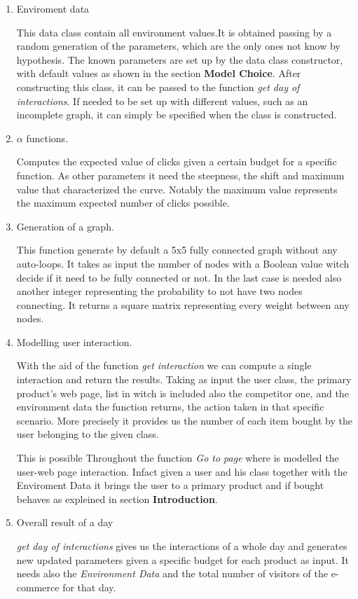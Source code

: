  \begin{enumerate}
     \item  Enviroment data
     
     This data class contain all environment values.It is obtained passing by a random generation of the parameters, which are the only ones not know by hypothesis. The known parameters are set up by the data class constructor, with default values as shown in the section \textbf{Model Choice}. After constructing this class, it can be passed to the function  \textit{get day of interactions}. If needed to be set up with different values, such as an incomplete graph, it can simply be specified when the class is constructed.
    
     \item  $\alpha$ functions.
     
     Computes the expected value of clicks given a certain budget for a specific function. As other parameters it need the steepness, the shift and maximum value that characterized the curve. Notably the maximum value represents the maximum expected number of clicks possible.
  
    \item Generation of a graph.
    
    This function generate by default a 5x5 fully connected graph without any auto-loops. It takes as input the number of nodes with a Boolean value witch decide if it need to be fully connected or not. In the last case is needed also another integer representing the probability to not have two nodes connecting. It returns a square matrix representing every weight between any nodes.
   
    \item Modelling user interaction.
    
    With the aid of the function \textit{get interaction} we can compute a single interaction and return the results. Taking as input the user class, the primary product's web page, list in witch is included also the competitor one, and the environment data the function returns, the action taken in that specific scenario. More precisely it provides us the number of each item bought by the user belonging to the given class.
    
    This is possible Throughout the function \textit{Go to page} where is modelled the user-web page interaction. Infact given a user and his class together with the Enviroment Data it brings the user to a primary product and if bought behaves as expleined in section \textbf{Introduction}.
    
    \item Overall result of a day
    
    \textit{get day of interactions} gives us the interactions of a whole day and generates new updated parameters given a specific budget for each product as input. It needs also the \textit{Environment Data} and the total number of visitors of the e-commerce for that day.
    
\end{enumerate}
